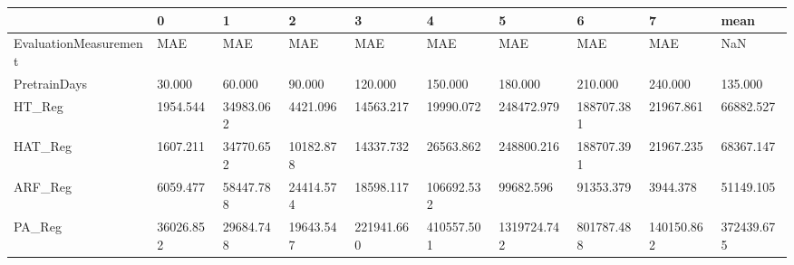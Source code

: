 \begin{tabular}{llllllllll}
\toprule
{} &          0 &          1 &          2 &           3 &           4 &            5 &           6 &           7 &        mean \\
\midrule
EvaluationMeasurement &        MAE &        MAE &        MAE &         MAE &         MAE &          MAE &         MAE &         MAE &         NaN \\
PretrainDays          &     30.000 &     60.000 &     90.000 &     120.000 &     150.000 &      180.000 &     210.000 &     240.000 &     135.000 \\
HT\_Reg                &   1954.544 &  34983.062 &   4421.096 &   14563.217 &   19990.072 &   248472.979 &  188707.381 &   21967.861 &   66882.527 \\
HAT\_Reg               &   1607.211 &  34770.652 &  10182.878 &   14337.732 &   26563.862 &   248800.216 &  188707.391 &   21967.235 &   68367.147 \\
ARF\_Reg               &   6059.477 &  58447.788 &  24414.574 &   18598.117 &  106692.532 &    99682.596 &   91353.379 &    3944.378 &   51149.105 \\
PA\_Reg                &  36026.852 &  29684.748 &  19643.547 &  221941.660 &  410557.501 &  1319724.742 &  801787.488 &  140150.862 &  372439.675 \\
\bottomrule
\end{tabular}
